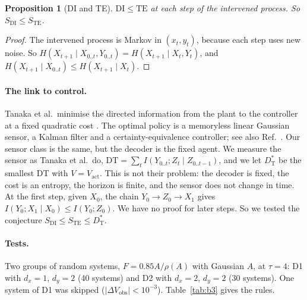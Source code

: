 \documentclass[11pt]{article}
\newtheorem{proposition}{Proposition}
\newcommand{\Vact}{V_{\mathrm{act}}}
\newcommand{\STE}{S_{\mathrm{TE}}}
\newcommand{\SDI}{S_{\mathrm{DI}}}
\newcommand{\DT}{D_{\mathrm{T}}^{\ast}}
\begin{document}
\begin{proposition}[DI and TE]\label{prop:F2}
$\mathrm{DI}\le\mathrm{TE}$ at each step of the intervened process. So $\SDI\le\STE$.
\end{proposition}
\begin{proof}
The intervened process is Markov in $(x_t,y_t)$, because each step uses new noise. So
$H(X_{t+1}\mid X_{0..t},Y_{0..t})=H(X_{t+1}\mid X_t,Y_t)$, and $H(X_{t+1}\mid X_{0..t})\le H(X_{t+1}\mid X_t)$.
\end{proof}

\paragraph{The link to control.} Tanaka et al.\ minimise the directed information from the plant to the controller at
a fixed quadratic cost \cite{TanakaEsfahaniMitter18}. The optimal policy is a memoryless linear Gaussian sensor, a
Kalman filter and a certainty-equivalence controller; see also Ref.~\cite{SabagTianKostinaHassibi23}. Our sensor class
is the same, but the decoder is the fixed agent. We measure the sensor as Tanaka et al.\ do,
$\mathrm{DT}=\sum_tI(Y_{0..t};Z_t\mid Z_{0..t-1})$, and we let $\DT$ be the smallest DT with $V=\Vact$. This is not their
problem: the decoder is fixed, the cost is an entropy, the horizon is finite, and the sensor does not change in time.
At the first step, given $X_0$, the chain $Y_0\to Z_0\to X_1$ gives
$I(Y_0;X_1\mid X_0)\le I(Y_0;Z_0)$. We have no proof for later steps. So we tested the conjecture
$\SDI\le\STE\le\DT$.

\paragraph{Tests.} Two groups of random systems, $F=0.85A/\rho(A)$ with Gaussian $A$, at $\tau=4$: D1 with $d_x=1$,
$d_y=2$ (40 systems) and D2 with $d_x=2$, $d_y=2$ (30 systems). One system of D1 was skipped ($|\Delta
V_{\mathrm{obs}}|<10^{-3}$). Table~\ref{tab:b3} gives the rules.
\end{document}
